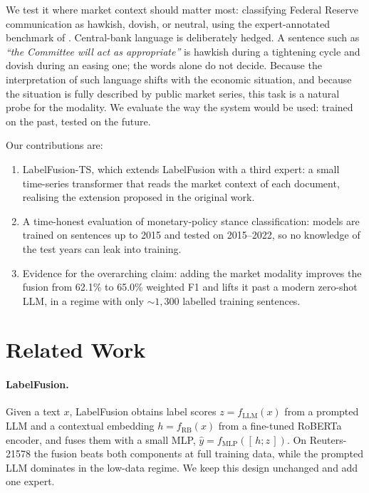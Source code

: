 \documentclass[11pt]{article}
\newcommand{\lfts}{LabelFusion\hbox{-}TS}
\newcommand{\lf}{LabelFusion}
\begin{document}
We test it where market context should matter most: classifying Federal Reserve communication as hawkish, dovish, or neutral, using the expert-annotated benchmark of \citet{shah2023trillion}. Central-bank language is deliberately hedged. A sentence such as \emph{``the Committee will act as appropriate''} is hawkish during a tightening cycle and dovish during an easing one; the words alone do not decide. Because the interpretation of such language shifts with the economic situation, and because the situation is fully described by public market series, this task is a natural probe for the modality. We evaluate the way the system would be used: trained on the past, tested on the future.

Our contributions are:
\begin{enumerate}
\item \lfts{}, which extends \lf{} with a third expert: a small time-series transformer that reads the market context of each document, realising the extension proposed in the original work.
\item A time-honest evaluation of monetary-policy stance classification: models are trained on sentences up to 2015 and tested on 2015--2022, so no knowledge of the test years can leak into training.
\item Evidence for the overarching claim: adding the market modality improves the fusion from 62.1\% to 65.0\% weighted F1 and lifts it past a modern zero-shot LLM, in a regime with only ${\sim}1{,}300$ labelled training sentences.
\end{enumerate}


\section{Related Work}

\paragraph{\lf{}.}
Given a text $x$, \lf{} \citep{schlee2025labelfusion} obtains label scores $z = f_{\mathrm{LLM}}(x)$ from a prompted LLM and a contextual embedding $h = f_{\mathrm{RB}}(x)$ from a fine-tuned RoBERTa encoder, and fuses them with a small MLP, $\hat{y} = f_{\mathrm{MLP}}([\,h;z\,])$. On Reuters-21578 the fusion beats both components at full training data, while the prompted LLM dominates in the low-data regime. We keep this design unchanged and add one expert.
\end{document}
